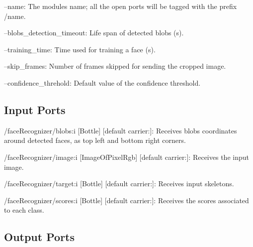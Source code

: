 \begin{DoxyItemize}
\item --name\+: The module\textquotesingle{}s name; all the open ports will be tagged with the prefix /name.
\item --blobs\+\_\+detection\+\_\+timeout\+: Life span of detected blobs (s).
\item --training\+\_\+time\+: Time used for training a face (s).
\item --skip\+\_\+frames\+: Number of frames skipped for sending the cropped image.
\item --confidence\+\_\+threhold\+: Default value of the confidence threshold. 
\end{DoxyItemize}\hypertarget{group__skeletonViewer_inputports_sec}{}\subsection{Input Ports}\label{group__skeletonViewer_inputports_sec}

\begin{DoxyItemize}
\item /face\+Recognizer/blobs\+:i \mbox{[}Bottle\mbox{]} \mbox{[}default carrier\+:\mbox{]}\+: Receives blobs\textquotesingle{} coordinates around detected faces, as top left and bottom right corners.
\item /face\+Recognizer/image\+:i \mbox{[}Image\+Of\+Pixel\+Rgb\mbox{]} \mbox{[}default carrier\+:\mbox{]}\+: Receives the input image.
\item /face\+Recognizer/target\+:i \mbox{[}Bottle\mbox{]} \mbox{[}default carrier\+:\mbox{]}\+: Receives input skeletons.
\item /face\+Recognizer/scores\+:i \mbox{[}Bottle\mbox{]} \mbox{[}default carrier\+:\mbox{]}\+: Receives the scores associated to each class.
\end{DoxyItemize}\hypertarget{group__skeletonViewer_outputports_sec}{}\subsection{Output Ports}\label{group__skeletonViewer_outputports_sec}

